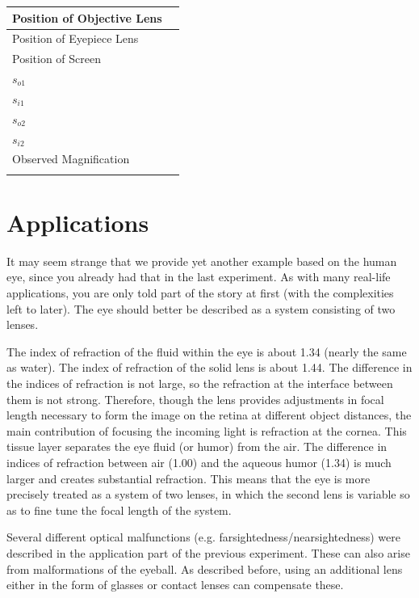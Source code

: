 \begin{center}
\begin{tabular}{|l|l|}
\hline
Position of Objective Lens & \hspace{4 cm} \\ \hline
Position of Eyepiece Lens &                    \\ \hline
Position of Screen &                    \\ \hline
$s_{o1}$ & \\ \hline
$s_{i1}$ & \\ \hline
$s_{o2}$ & \\ \hline
$s_{i2}$ & \\ \hline
Observed Magnification & \\ \hline
\label{tab:telescope}
\end{tabular}
\end{center}

\section{Applications}
It may seem strange that we provide yet another example based on the human eye, since you already had that in the last experiment. As with many real-life applications, you are only told part of the story at first (with the complexities left to later). The eye should better be described as a system consisting of two lenses.\myskip

The index of refraction of the fluid within the eye is about 1.34 (nearly the same as water). The index of refraction of the solid lens is about 1.44. The difference in the indices of refraction is not large, so the refraction at the interface between them is not strong. Therefore, though the lens provides adjustments in focal length necessary to form the image on the retina at different object distances, the main contribution of focusing the incoming light is refraction at the cornea. This tissue layer separates the eye fluid (or humor) from the air. The difference in indices of refraction between air (1.00) and the aqueous humor (1.34) is much larger and creates substantial refraction. This means that the eye is more precisely treated as a system of two lenses, in which the second lens is variable so as to fine tune the focal length of the system.\myskip

Several different optical malfunctions (e.g. farsightedness/nearsightedness) were described in the application part of the previous experiment. These can also arise from malformations of the eyeball. As described before, using an additional lens either in the form of glasses or contact lenses can compensate these. \myskip

